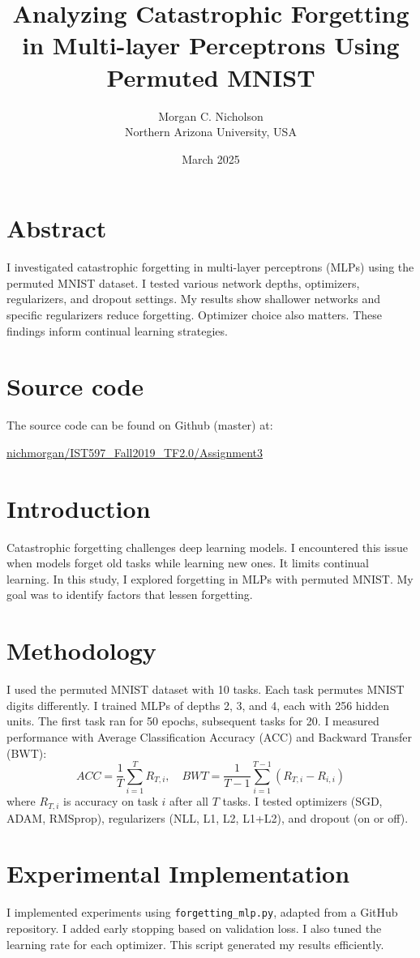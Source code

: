 \documentclass{article}
\title{Analyzing Catastrophic Forgetting in Multi-layer Perceptrons Using Permuted MNIST}
\author{Morgan C. Nicholson \\ Northern Arizona University, USA}
\date{March 2025}
\begin{document}
\maketitle

\section*{Abstract}
I investigated catastrophic forgetting in multi-layer perceptrons (MLPs) using the permuted MNIST dataset. I tested various network depths, optimizers, regularizers, and dropout settings. My results show shallower networks and specific regularizers reduce forgetting. Optimizer choice also matters. These findings inform continual learning strategies.

\section*{Source code}
The source code can be found on Github (master) at:

\href{https://github.com/nichmorgan/IST597\_Fall2019\_TF2.0/tree/master/Assignment3}{nichmorgan/IST597\_Fall2019\_TF2.0/Assignment3}

\section{Introduction}
Catastrophic forgetting challenges deep learning models. I encountered this issue when models forget old tasks while learning new ones. It limits continual learning. In this study, I explored forgetting in MLPs with permuted MNIST. My goal was to identify factors that lessen forgetting.

\section{Methodology}
I used the permuted MNIST dataset with 10 tasks. Each task permutes MNIST digits differently. I trained MLPs of depths 2, 3, and 4, each with 256 hidden units. The first task ran for 50 epochs, subsequent tasks for 20. I measured performance with Average Classification Accuracy (ACC) and Backward Transfer (BWT):
\[
ACC = \frac{1}{T} \sum_{i=1}^T R_{T,i}, \quad BWT = \frac{1}{T-1} \sum_{i=1}^{T-1} (R_{T,i} - R_{i,i})
\]
where \( R_{T,i} \) is accuracy on task \( i \) after all \( T \) tasks. I tested optimizers (SGD, ADAM, RMSprop), regularizers (NLL, L1, L2, L1+L2), and dropout (on or off).

\section{Experimental Implementation}
I implemented experiments using \texttt{forgetting\_mlp.py}, adapted from a GitHub repository. I added early stopping based on validation loss. I also tuned the learning rate for each optimizer. This script generated my results efficiently.
\end{document}
